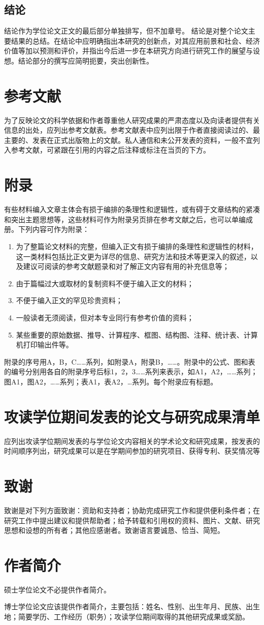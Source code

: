 \subsection{结论}
结论作为学位论文正文的最后部分单独排写，但不加章号。
结论是对整个论文主要结果的总结。在结论中应明确指出本研究的创新点，对其应用前景和社会、经济价值等加以预测和评价，并指出今后进一步在本研究方向进行研究工作的展望与设想。结论部分的撰写应简明扼要，突出创新性。


\section{参考文献}
为了反映论文的科学依据和作者尊重他人研究成果的严肃态度以及向读者提供有关信息的出处，应列出参考文献表。参考文献表中应列出限于作者直接阅读过的、最主要的、发表在正式出版物上的文献。私人通信和未公开发表的资料，一般不宜列入参考文献，可紧跟在引用的内容之后注释或标注在当页的下方。

\section{附录}
有些材料编入文章主体会有损于编排的条理性和逻辑性，或有碍于文章结构的紧凑和突出主题思想等，这些材料可作为附录另页排在参考文献之后，也可以单编成册。下列内容可作为附录：

\begin{enumerate}
\item 为了整篇论文材料的完整，但编入正文有损于编排的条理性和逻辑性的材料，这一类材料包括比正文更为详尽的信息、研究方法和技术等更深入的叙述，以及建议可阅读的参考文献题录和对了解正文内容有用的补充信息等；
\item 由于篇幅过大或取材的复制资料不便于编入正文的材料；
\item 不便于编入正文的罕见珍贵资料；
\item 一般读者无须阅读，但对本专业同行有参考价值的资料；
\item 某些重要的原始数据、推导、计算程序、框图、结构图、注释、统计表、计算机打印输出件等。
\end{enumerate}

附录的序号用A，B，C……系列，如附录A，附录B，……。附录中的公式、图和表的编号分别用各自的附录序号后标1，2，3……系列来表示，如A1，A2，……系列；图A1，图A2，……系列；表A1，表A2，…系列。每个附录应有标题。

\section{攻读学位期间发表的论文与研究成果清单}
应列出攻读学位期间发表的与学位论文内容相关的学术论文和研究成果，按发表的时间顺序列出，研究成果可以是在学期间参加的研究项目、获得专利、获奖情况等

\section{致谢}
致谢是对下列方面致谢：资助和支持者；协助完成研究工作和提供便利条件者；在研究工作中提出建议和提供帮助者；给予转载和引用权的资料、图片、文献、研究思想和设想的所有者；其他应感谢者。致谢语言要诚恳、恰当、简短。

\section{作者简介}
硕士学位论文不必提供作者简介。

博士学位论文应该提供作者简介，主要包括：姓名、性别、出生年月、民族、出生地；简要学历、工作经历（职务）；攻读学位期间取得的其他研究成果或奖励。

